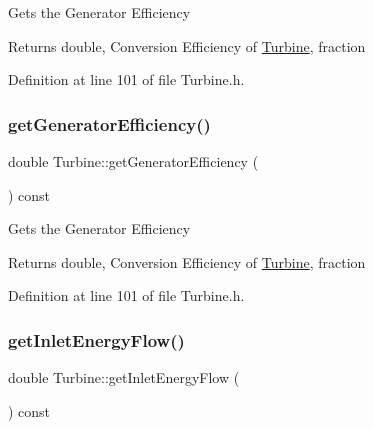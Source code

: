 Gets the Generator Efficiency

\begin{DoxyReturn}{Returns}
double, Conversion Efficiency of \hyperlink{class_turbine}{Turbine}, fraction 
\end{DoxyReturn}


Definition at line 101 of file Turbine.\+h.

\mbox{\label{class_turbine_a92266fd994310d1842ba37c05bc40bf8}} 
\subsubsection{\texorpdfstring{get\+Generator\+Efficiency()}{getGeneratorEfficiency()}\hspace{0.1cm}{\footnotesize\ttfamily [3/3]}}
{\footnotesize\ttfamily double Turbine\+::get\+Generator\+Efficiency (\begin{DoxyParamCaption}{ }\end{DoxyParamCaption}) const\hspace{0.3cm}{\ttfamily [inline]}}

Gets the Generator Efficiency

\begin{DoxyReturn}{Returns}
double, Conversion Efficiency of \hyperlink{class_turbine}{Turbine}, fraction 
\end{DoxyReturn}


Definition at line 101 of file Turbine.\+h.

\mbox{\label{class_turbine_ae5d55a7b882e4780d490d43409f8f06c}} 
\subsubsection{\texorpdfstring{get\+Inlet\+Energy\+Flow()}{getInletEnergyFlow()}\hspace{0.1cm}{\footnotesize\ttfamily [1/3]}}
{\footnotesize\ttfamily double Turbine\+::get\+Inlet\+Energy\+Flow (\begin{DoxyParamCaption}{ }\end{DoxyParamCaption}) const\hspace{0.3cm}{\ttfamily [inline]}}

